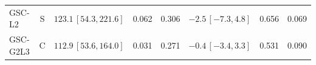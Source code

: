\documentclass[10pt,a4paper]{article}
\begin{document}
\begin{longtable}{lcp{37mm}rrp{37mm}rr}
GSC-L2 & S & \(123.1\,[54.3,221.6]\) & 0.062 & 0.306 & \(-2.5\,[-7.3,4.8]\) & 0.656 & 0.069\\
GSC-G2L3 & C & \(112.9\,[53.6,164.0]\) & 0.031 & 0.271 & \(-0.4\,[-3.4,3.3]\) & 0.531 & 0.090\\

\end{longtable}
\end{document}
